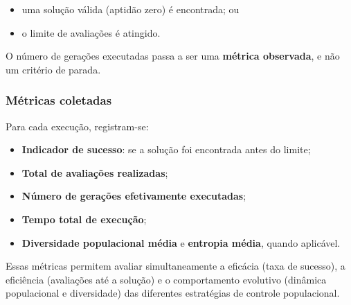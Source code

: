 \begin{itemize}
    \item uma solução válida (aptidão zero) é encontrada; ou
    \item o limite de avaliações é atingido.
\end{itemize}

O número de gerações executadas passa a ser uma \textbf{métrica observada}, e não um critério de parada.

\subsubsection*{Métricas coletadas}

Para cada execução, registram-se:

\begin{itemize}
    \item \textbf{Indicador de sucesso}: se a solução foi encontrada antes do limite;
    \item \textbf{Total de avaliações realizadas};
    \item \textbf{Número de gerações efetivamente executadas};
    \item \textbf{Tempo total de execução};
    \item \textbf{Diversidade populacional média} e \textbf{entropia média}, quando aplicável.
\end{itemize}

Essas métricas permitem avaliar simultaneamente a eficácia (taxa de sucesso), a eficiência (avaliações até a solução) e o comportamento evolutivo (dinâmica populacional e diversidade) das diferentes estratégias de controle populacional.
